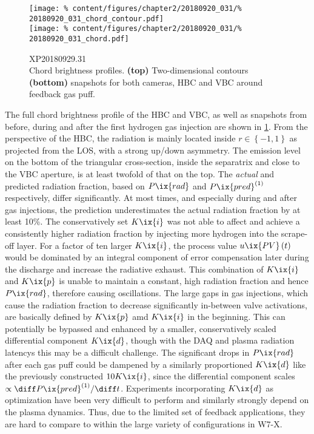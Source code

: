 %
            \begin{figure}[t]%
                \centering%
                \texttt{[image: \%
                    content/figures/chapter2/20180920\_031/\%
                    20180920\_031\_chord\_contour.pdf]}\\%
                \texttt{[image: \%
                    content/figures/chapter2/20180920\_031/\%
                    20180920\_031\_chord.pdf]}\\%
                \caption{%
                    XP20180929.31\\%
                    Chord brightness profiles. \textbf{(top)} Two-dimensional contours \textbf{(bottom)} snapshots for both cameras, HBC and VBC around feedback gas puff.}\label{fig:20180920.31_CP}%
            \end{figure}%
%
            The full chord brightness profile of the HBC and VBC, as well as snapshots from before, during and after the first hydrogen gas injection are shown in \cref{fig:20180920.31_CP}. From the perspective of the HBC, the radiation is mainly located inside $r\in\left\{-1, 1\right\}$ as projected from the LOS, with a strong up/down asymmetry. The emission level on the bottom of the triangular cross-section, inside the separatrix and close to the VBC aperture, is at least twofold of that on the top. The \textit{actual} and predicted radiation fraction, based on $P\ix{rad}$ and $P\ix{pred}^{\left(1\right)}$ respectively, differ significantly. At most times, and especially during and after gas injections, the prediction underestimates the actual radiation fraction by at least 10\%. The conservatively set $K\ix{i}$ was not able to affect and achieve a consistently higher radiation fraction by injecting more hydrogen into the scrape-off layer. For a factor of ten larger $K\ix{i}$, the process value $u\ix{PV}\left(t\right)$ would be dominated by an integral component of error compensation later during the discharge and increase the radiative exhaust. This combination of $K\ix{i}$ and $K\ix{p}$ is unable to maintain a constant, high radiation fraction and hence $P\ix{rad}$, therefore causing oscillations. The large gaps in gas injections, which cause the radiation fraction to decrease significantly in-between valve activations, are basically defined by $K\ix{p}$ amd $K\ix{i}$ in the beginning. This can potentially be bypassed and enhanced by a smaller, conservatively scaled differential component $K\ix{d}$, though with the DAQ and plasma radiation latencys this may be a difficult challenge. The significant drops in $P\ix{rad}$ after each gas puff could be dampened by a similarly proportioned $K\ix{d}$ like the previously constructed $10K\ix{i}$, since the differential component scales $\propto\diff P\ix{pred}^{\left(1\right)}/\diff t$. Experiments incorporating $K\ix{d}$ as optimization have been very difficult to perform and similarly strongly depend on the plasma dynamics. Thus, due to the limited set of feedback applications, they are hard to compare to within the large variety of configurations in W7-X.\\%
